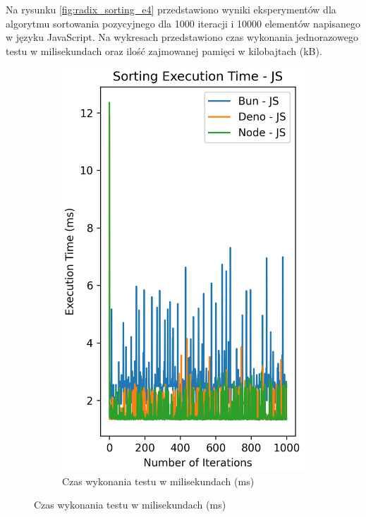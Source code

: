 Na rysunku \ref{fig:radix_sorting_e4} przedstawiono wyniki eksperymentów dla algorytmu sortowania pozycyjnego dla 1000 iteracji i 10000 elementów napisanego w języku JavaScript. Na wykresach przedstawiono czas wykonania jednorazowego testu w milisekundach oraz ilość zajmowanej pamięci w kilobajtach (kB).

\begin{figure}[H]
  \centering
  \begin{subfigure}[b]{0.42\textwidth}
    \centering
    \includegraphics[width=\textwidth]{Figures/sorting/sorting_radix_1000_10000_js_time.png}
    \caption{Czas wykonania testu w milisekundach (ms)}

\end{subfigure}
\end{figure}
